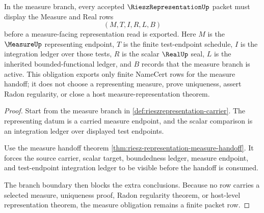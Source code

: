 \begin{theorem}
\label{thm:riesz-representation-measure-row-obligation}
In the measure branch, every accepted $\RieszRepresentationUp$ packet must display the Measure and Real rows
$$
(M,T,I,R,L,B)
$$
before a measure-facing representation read is exported. Here $M$ is the $\MeasureUp$ representing endpoint, $T$ is the finite test-endpoint schedule, $I$ is the integration ledger over those tests, $R$ is the scalar $\RealUp$ seal, $L$ is the inherited bounded-functional ledger, and $B$ records that the measure branch is active. This obligation exports only finite NameCert rows for the measure handoff; it does not choose a representing measure, prove uniqueness, assert Radon regularity, or close a host measure-representation theorem.
\end{theorem}
\begin{proof}
Start from the measure branch in \autoref{def:rieszrepresentation-carrier}. The representing datum is a carried measure endpoint, and the scalar comparison is an integration ledger over displayed test endpoints.

Use the measure handoff theorem \autoref{thm:riesz-representation-measure-handoff}. It forces the source carrier, scalar target, boundedness ledger, measure endpoint, and test-endpoint integration ledger to be visible before the handoff is consumed.

The branch boundary then blocks the extra conclusions. Because no row carries a selected measure, uniqueness proof, Radon regularity theorem, or host-level representation theorem, the measure obligation remains a finite packet row.
\end{proof}

